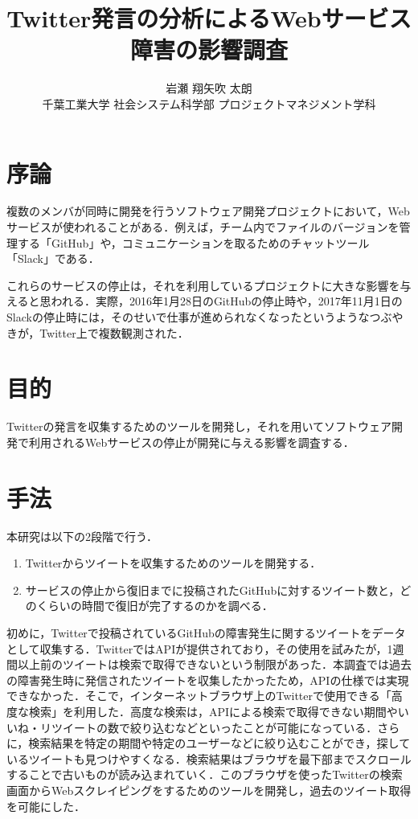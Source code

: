 \documentclass[uplatex,twocolumn]{jsarticle}
\title{\vspace{-10mm}Twitter発言の分析によるWebサービス障害の影響調査\footnotemark[0]}
\author{\large{岩瀬 翔\footnotemark[2]\qquad 矢吹 太朗}\\千葉工業大学 社会システム科学部 プロジェクトマネジメント学科\footnotemark[3]}
\date{}
\begin{document}
\twocolumn[\maketitle]

\begingroup
\def\thefootnote{\fnsymbol{footnote}}
\endgroup

\section{序論}
複数のメンバが同時に開発を行うソフトウェア開発プロジェクトにおいて，Webサービスが使われることがある．例えば，チーム内でファイルのバージョンを管理する「GitHub」や，コミュニケーションを取るためのチャットツール「Slack」である\cite{01}．

これらのサービスの停止は，それを利用しているプロジェクトに大きな影響を与えると思われる．実際，2016年1月28日のGitHubの停止時や，2017年11月1日のSlackの停止時には，そのせいで仕事が進められなくなったというようなつぶやきが，Twitter上で複数観測された\cite{02}．

\section{目的}

Twitterの発言を収集するためのツールを開発し，それを用いてソフトウェア開発で利用されるWebサービスの停止が開発に与える影響を調査する．

\section{手法}

本研究は以下の2段階で行う．
\begin{enumerate}
 \item Twitterからツイートを収集するためのツールを開発する．
 \item サービスの停止から復旧までに投稿されたGitHubに対するツイート数と，どのくらいの時間で復旧が完了するのかを調べる．
\end{enumerate}

初めに，Twitterで投稿されているGitHubの障害発生に関するツイートをデータとして収集する．TwitterではAPIが提供されており，その使用を試みたが，1週間以上前のツイートは検索で取得できないという制限があった\cite{03}．本調査では過去の障害発生時に発信されたツイートを収集したかったため，APIの仕様では実現できなかった．そこで，インターネットブラウザ上のTwitterで使用できる「高度な検索」を利用した．高度な検索は，APIによる検索で取得できない期間やいいね・リツイートの数で絞り込むなどといったことが可能になっている．さらに，検索結果を特定の期間や特定のユーザーなどに絞り込むことができ，探しているツイートも見つけやすくなる．検索結果はブラウザを最下部までスクロールすることで古いものが読み込まれていく．このブラウザを使ったTwitterの検索画面からWebスクレイピングをするためのツールを開発し，過去のツイート取得を可能にした．
\end{document}
